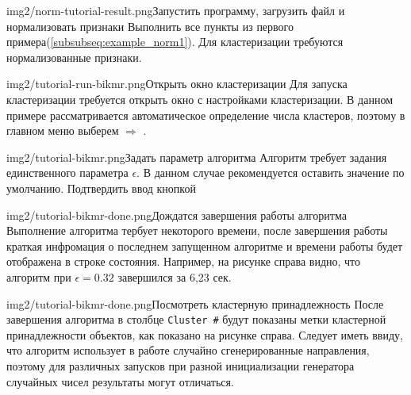 \documentclass[12pt,tikz]{instruction}
\begin{document}
\begin{steps}
	\begin{ist}{img2/norm-tutorial-result.png}{Запустить программу, загрузить файл и нормализовать признаки}
		Выполнить все пункты из первого примера(\ref{subsubseq:example_norm1}). Для кластеризации требуются нормализованные признаки.		
	\end{ist}
	\begin{ist}{img2/tutorial-run-bikmr.png}{Открыть окно кластеризации}
		Для запуска кластеризации требуется открыть окно с настройками кластеризации. В данном примере рассматривается автоматическое определение числа кластеров, поэтому в главном меню выберем  $ \Rightarrow $ . 
	\end{ist}
	\begin{ist}{img2/tutorial-bikmr.png}{Задать параметр алгоритма}
		Алгоритм \BiKMR требует задания единственного параметра $ \epsilon $. В данном случае рекомендуется оставить значение по умолчанию. Подтвердить ввод кнопкой 
	\end{ist}
	\begin{ist}{img2/tutorial-bikmr-done.png}{Дождатся завершения работы алгоритма}
		Выполнение алгоритма тербует некоторого времени, после завершения работы краткая инфромация о последнем запущенном алгоритме и времени работы будет отображена в строке состояния. Например, на рисунке справа видно, что алгоритм \BiKMR при $ \epsilon=0.32 $ завершился за 6,23 сек.
	\end{ist}
	\begin{ist}{img2/tutorial-bikmr-done.png}{Посмотреть кластерную принадлежность}
		После завершения алгоритма в столбце \texttt{Cluster \#} будут показаны метки кластерной принадлежности объектов, как показано на рисунке справа. Следует иметь ввиду, что алгоритм \BiKMR использует в работе случайно сгенерированные направления, поэтому для различных запусков при разной инициализации генератора случайных чисел результаты могут отличаться.
	\end{ist}
	

\end{steps}
\end{document}
